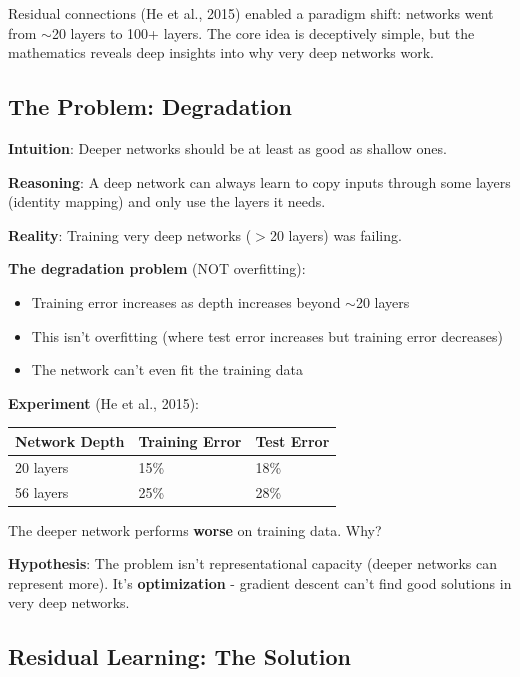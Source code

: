 \documentclass[11pt,oneside]{book}
\begin{document}
Residual connections (He et al., 2015) enabled a paradigm shift: networks went from $\sim$20 layers to 100+ layers. The core idea is deceptively simple, but the mathematics reveals deep insights into why very deep networks work.

\subsection{The Problem: Degradation}

\textbf{Intuition}: Deeper networks should be at least as good as shallow ones.

\textbf{Reasoning}: A deep network can always learn to copy inputs through some layers (identity mapping) and only use the layers it needs.

\textbf{Reality}: Training very deep networks ($>$20 layers) was failing.

\textbf{The degradation problem} (NOT overfitting):
\begin{itemize}
\item Training error increases as depth increases beyond $\sim$20 layers
\item This isn't overfitting (where test error increases but training error decreases)
\item The network can't even fit the training data
\end{itemize}

\textbf{Experiment} (He et al., 2015):

\begin{table}[h]
\centering
\begin{tabular}{lll}
\toprule
\textbf{Network Depth} & \textbf{Training Error} & \textbf{Test Error} \\
\midrule
20 layers & 15\% & 18\% \\
56 layers & 25\% & 28\% \\
\bottomrule
\end{tabular}
\end{table}

The deeper network performs \textbf{worse} on training data. Why?

\textbf{Hypothesis}: The problem isn't representational capacity (deeper networks can represent more). It's \textbf{optimization} - gradient descent can't find good solutions in very deep networks.

\subsection{Residual Learning: The Solution}
\end{document}
